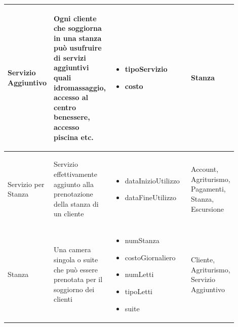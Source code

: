 \documentclass[12pt,a4paper]{article}
\begin{document}
\begin{center}
\begin{longtable}{|p{0.14\linewidth}|p{0.20\linewidth}|p{0.36\linewidth}|p{0.20\linewidth}|}
\hline
Servizio Aggiuntivo				 	& \begin{flushleft}\vspace{-25pt} Ogni cliente che soggiorna in una stanza può usufruire di servizi aggiuntivi quali idromassaggio, accesso al centro benessere, accesso piscina etc. \end{flushleft}
					& \begin{itemize}
						\setlength{\itemindent}{-1em}
						\vspace{-25pt}
						\setlength\itemsep{-0.25em}
						\item tipoServizio
						\item costo
					\end{itemize}
					& \begin{flushleft}\vspace{-25pt} Stanza \end{flushleft} \\ 

\hline
Servizio per Stanza				 	& \begin{flushleft}\vspace{-25pt} Servizio effettivamente aggiunto alla prenotazione della stanza di un cliente \end{flushleft}
					& \begin{itemize}
						\setlength{\itemindent}{-1em}
						\vspace{-25pt}
						\setlength\itemsep{-0.25em}
						\item dataInizioUtilizzo
						\item dataFineUtilizzo
					\end{itemize}
					& \begin{flushleft}\vspace{-25pt} Account, Agriturismo, Pagamenti, Stanza, Escursione \end{flushleft} \\ 

\hline
Stanza				 	& \begin{flushleft}\vspace{-25pt} Una camera singola o suite che può essere prenotata per il soggiorno dei clienti \end{flushleft}
					& \begin{itemize}
						\setlength{\itemindent}{-1em}
						\vspace{-25pt}
						\setlength\itemsep{-0.25em}
						\item numStanza
						\item costoGiornaliero
						\item numLetti
						\item tipoLetti
						\item suite
					\end{itemize}
					& \begin{flushleft}\vspace{-25pt} Cliente, Agriturismo, Servizio Aggiuntivo \end{flushleft} \\ 


\end{longtable}
\end{center}
\end{document}
